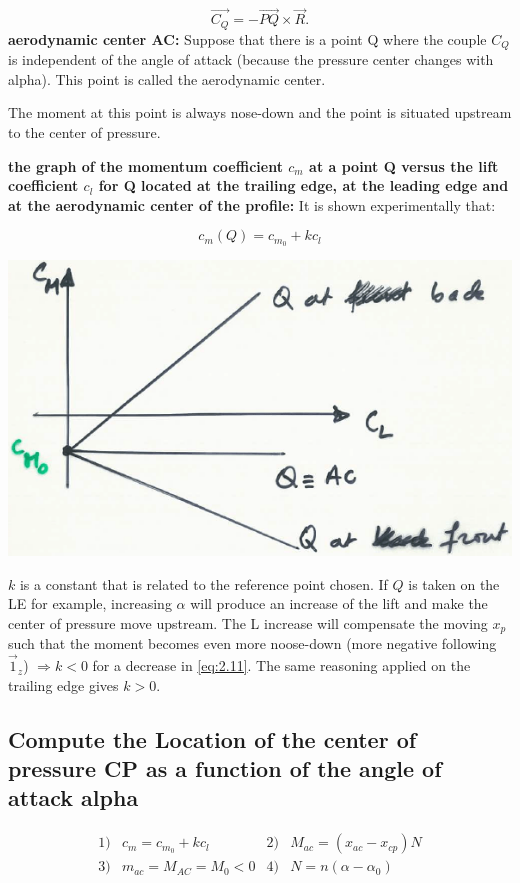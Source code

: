 \documentclass[british,french,11pt, a4paper, openany]{article}
\begin{document}
\begin{equation}
\vec{C_Q} = -\vec{PQ}\times \vec{R}.
\end{equation}
\textbf{aerodynamic center AC:} Suppose that there is a point Q where the couple $C_Q$ is independent of the angle of attack (because the pressure center changes with alpha). This point is called the aerodynamic center.

The moment at this point is always nose-down and the point is situated upstream to the center of pressure.

\textbf{the graph of the momentum coefficient $c_m$ at a point Q versus the
	lift coefficient $c_l$ for Q located at the trailing edge, at the leading edge and at
	the aerodynamic center of the profile:} It is shown experimentally that:

\begin{equation}
c_m(Q) = c_{m_0} + k c_l
\label{eq:2.11}
\end{equation}

\begin{center}
	\includegraphics[scale=0.23]{ch2/14}
\end{center}
$k$ is a constant that is related to the reference point chosen. If $Q$ is taken on the LE for example, increasing $\alpha$ will produce an increase of the lift and make the center of pressure move upstream. The L increase will compensate the moving $x_p$ such that the moment becomes even more noose-down (more negative following $\vec{1}_z$) $\Rightarrow k<0$ for a decrease in \eqref{eq:2.11}. The same reasoning applied on the trailing edge gives $k>0$. 
\subsection{Compute the Location of the center of pressure CP as a function of the angle of
	attack alpha}
\begin{equation}
\begin{array}{cccc}
1) & c_m = c_{m_0} + kc_l & 2)& M_{ac} = (x_{ac}-x_{cp})N \\
3) & m_{ac} = M_{AC} = M_0 <0 & 4) & N = n(\alpha-\alpha _0)
\end{array}
\end{equation}
\end{document}

